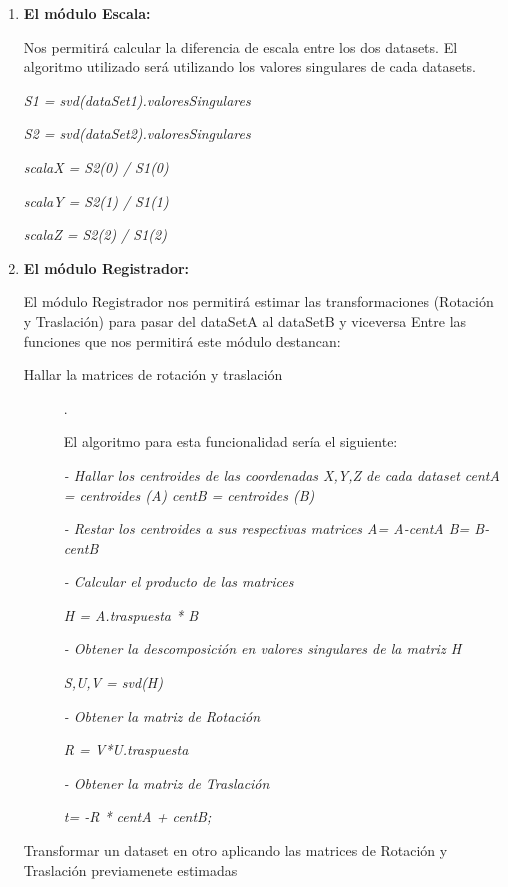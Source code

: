 \begin{enumerate}
\item \textbf{El módulo Escala:}

Nos permitirá calcular la diferencia de escala entre los dos datasets.
El algoritmo utilizado será utilizando los valores singulares de cada datasets.
        
	
		\textit{S1 = svd(dataSet1).valoresSingulares}

	    \textit{S2 = svd(dataSet2).valoresSingulares}

	    \textit{scalaX = S2(0)  / S1(0) }

	    \textit{scalaY = S2(1)  / S1(1) }

		\textit{scalaZ = S2(2)  / S1(2) }
		



\item \textbf{El módulo Registrador:}

El módulo Registrador nos permitirá estimar las transformaciones (Rotación y Traslación) para pasar del dataSetA al dataSetB y viceversa
Entre las funciones que nos permitirá este módulo destancan:
    \begin{description}
	\item [Hallar la matrices de rotación y traslación] .

		El algoritmo para esta funcionalidad sería el siguiente:

        \textit{
		- Hallar los centroides de las coordenadas X,Y,Z de cada dataset
		  centA = centroides (A)
          centB = centroides (B)
        }

        \textit{
        - Restar los centroides a sus respectivas matrices
          A= A-centA
          B= B-centB
        }

        \textit{
        - Calcular el producto de las matrices}

        \textit{
          H = A.traspuesta * B
        }

        \textit{
        - Obtener la descomposición en valores singulares de la matriz H
        }

        \textit{
          S,U,V = svd(H) }
        
        \textit{
        - Obtener la matriz de Rotación}

        \textit{
          R = V*U.traspuesta}

        \textit{
        - Obtener la matriz de Traslación}

        \textit{ 
          t= -R * centA + centB;  
        }

	\item[Transformar un dataset en otro aplicando las matrices de Rotación y Traslación previamenete estimadas]


\end{description}
\end{enumerate}
